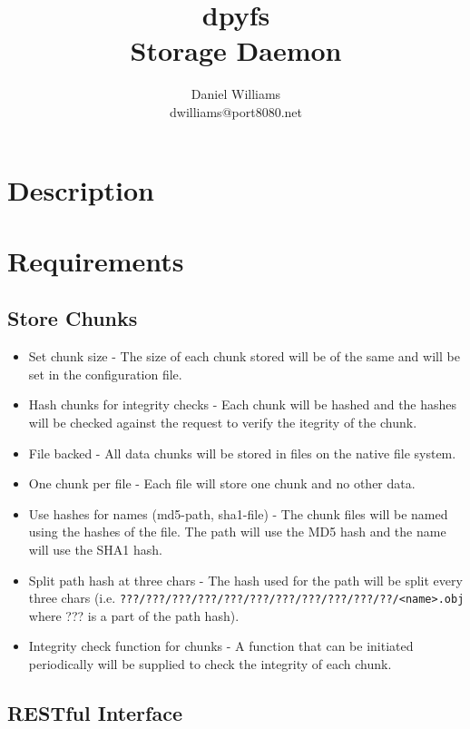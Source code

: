 \documentclass[letterpaper]{article}
\title{dpyfs \\ Storage Daemon}
\author{Daniel Williams \\ dwilliams@port8080.net}
\begin{document}
\maketitle

\section{Description}

\section{Requirements}

\subsection{Store Chunks}

\begin{itemize}
\item
Set chunk size - The size of each chunk stored will be of the same and will be set in the configuration file.

\item
Hash chunks for integrity checks - Each chunk will be hashed and the hashes will be checked against the request to
verify the itegrity of the chunk.

\item
File backed - All data chunks will be stored in files on the native file system.

\item
One chunk per file - Each file will store one chunk and no other data.

\item
Use hashes for names (md5-path, sha1-file) - The chunk files will be named using the hashes of the file.  The path will
use the MD5 hash and the name will use the SHA1 hash.

\item
Split path hash at three chars - The hash used for the path will be split every three chars
(i.e. \verb=???/???/???/???/???/???/???/???/???/???/??/<name>.obj= where ??? is a part of the path hash).

\item
Integrity check function for chunks - A function that can be initiated periodically will be supplied to check the
integrity of each chunk.
\end{itemize}

\subsection{RESTful Interface}
\end{document}
